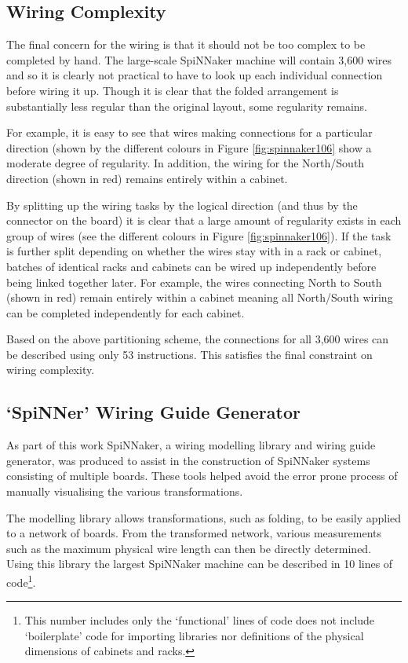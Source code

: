 		\subsection{Wiring Complexity}
			
			The final concern for the wiring is that it should not be too complex to
			be completed by hand. The large-scale SpiNNaker machine will contain 3,600
			wires and so it is clearly not practical to have to look up each
			individual connection before wiring it up. Though it is clear that the
			folded arrangement is substantially less regular than the original layout,
			some regularity remains.
			
			For example, it is easy to see that wires making connections for a
			particular direction (shown by the different colours in Figure
			\ref{fig:spinnaker106} show a moderate degree of regularity. In addition,
			the wiring for the North/South direction (shown in red) remains entirely
			within a cabinet.
			
			By splitting up the wiring tasks by the logical direction (and thus by the
			connector on the board) it is clear that a large amount of regularity
			exists in each group of wires (see the different colours in Figure
			\ref{fig:spinnaker106}). If the task is further split depending on whether
			the wires stay with in a rack or cabinet, batches of identical racks and
			cabinets can be wired up independently before being linked together later.
			For example, the wires connecting North to South (shown in red) remain
			entirely within a cabinet meaning all North/South wiring can be completed
			independently for each cabinet.
			
			Based on the above partitioning scheme, the connections for all 3,600
			wires can be described using only 53 instructions. This satisfies the
			final constraint on wiring complexity.
		
		\subsection{`SpiNNer' Wiring Guide Generator}
			
			As part of this work SpiNNaker, a wiring modelling library and wiring
			guide generator, was produced to assist in the construction of SpiNNaker
			systems consisting of multiple boards. These tools helped avoid the error
			prone process of manually visualising the various transformations.
			
			The modelling library allows transformations, such as folding, to be
			easily applied to a network of boards. From the transformed network,
			various measurements such as the maximum physical wire length can then be
			directly determined. Using this library the largest SpiNNaker machine can
			be described in 10 lines of code\footnote{This number includes only the
			`functional' lines of code does not include `boilerplate' code for
			importing libraries nor definitions of the physical dimensions of cabinets
			and racks.}.
			
